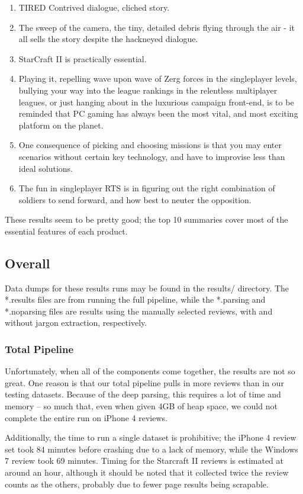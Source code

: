 \documentclass{article}
\begin{document}
\begin{description}
\begin{enumerate}
\item TIRED Contrived dialogue, cliched story.
\item The sweep of the camera, the tiny, detailed debris flying through the air - it all sells the story despite the hackneyed dialogue.
\item StarCraft II is practically essential.
\item Playing it, repelling wave upon wave of Zerg forces in the singleplayer levels, bullying your way into the league rankings in the relentless multiplayer leagues, or just hanging about in the luxurious campaign front-end, is to be reminded that PC gaming has always been the most vital, and most exciting platform on the planet.
\item One consequence of picking and choosing missions is that you may enter scenarios without certain key technology, and have to improvise less than ideal solutions.
\item The fun in singleplayer RTS is in figuring out the right combination of soldiers to send forward, and how best to neuter the opposition.
\end{enumerate}
\end{description}

These results seem to be pretty good; the top 10 summaries cover most of the
essential features of each product.

\subsection{Overall}
Data dumps for these results runs may be found in the results/ directory.
The *.results files are from running the full pipeline, while the
*.parsing and *.noparsing files are results using the manually selected
reviews, with and without jargon extraction, respectively.

\subsubsection{Total Pipeline}
Unfortunately, when all of the components come together, the results are not
so great. One reason is that our total pipeline pulls in more reviews than in
our testing datasets. Because of the deep parsing, this requires a lot of time
and memory -- so much that, even when given 4GB of heap space, we could not
complete the entire run on iPhone 4 reviews.

Additionally, the time to run a single dataset is prohibitive; the iPhone 4
review set took 84 minutes before crashing due to a lack of memory, while the
Windows 7 review took 69 minutes. Timing for the Starcraft II reviews is
estimated at around an hour, although it should be noted that it collected
twice the review counts as the others, probably due to fewer page results being
scrapable.
\end{document}
